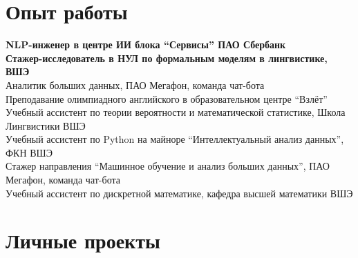 \documentclass[11pt]{article} %
\begin{document}

\section*{Опыт работы}

 \textbf{NLP-инженер в центре ИИ блока ``Сервисы'' ПАО Сбербанк}\\
 \textbf{Стажер-исследователь в НУЛ по формальным моделям в лингвистике, ВШЭ}\\
 Аналитик больших данных, ПАО Мегафон, команда чат-бота\\
 Преподавание олимпиадного английского в образовательном центре ``Взлёт''\\
 Учебный ассистент по теории вероятности и математической статистике, Школа Лингвистики ВШЭ\\
 Учебный ассистент по Python на майноре ``Интеллектуальный анализ данных'', ФКН ВШЭ\\
 Стажер направления ``Машинное обучение и анализ больших данных'', ПАО Мегафон, команда чат-бота\\
 Учебный ассистент по дискретной математике, кафедра высшей математики ВШЭ



\section*{Личные проекты}
\end{document}
